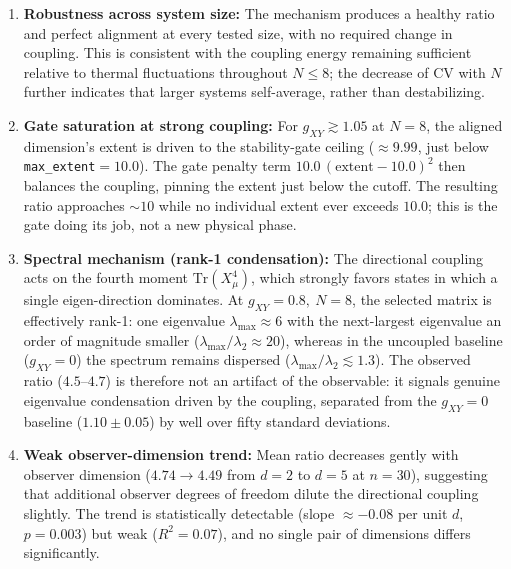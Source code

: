 \documentclass[12pt,a4paper]{article}
\begin{document}
\begin{enumerate}[leftmargin=*]
\item \textbf{Robustness across system size:}
The mechanism produces a healthy ratio and perfect alignment at every tested
size, with no required change in coupling. This is consistent with the
coupling energy remaining sufficient relative to thermal fluctuations
throughout $N \leq 8$; the decrease of CV with $N$ further indicates that
larger systems self-average, rather than destabilizing.

\item \textbf{Gate saturation at strong coupling:}
For $g_{XY} \gtrsim 1.05$ at $N=8$, the aligned dimension's extent is driven
to the stability-gate ceiling ($\approx 9.99$, just below
\texttt{max\_extent}$=10.0$). The gate penalty term
$10.0\,(\text{extent} - 10.0)^2$ then balances the coupling, pinning the
extent just below the cutoff. The resulting ratio approaches $\sim 10$ while
no individual extent ever exceeds $10.0$; this is the gate doing its job,
not a new physical phase.

\item \textbf{Spectral mechanism (rank-1 condensation):}
The directional coupling acts on the fourth moment
$\mathrm{Tr}(X_\mu^4)$, which strongly favors states in which a single
eigen-direction dominates. At $g_{XY}=0.8,\ N=8$, the selected matrix is
effectively rank-1: one eigenvalue $\lambda_{\max}\approx 6$ with the
next-largest eigenvalue an order of magnitude smaller
($\lambda_{\max}/\lambda_2 \approx 20$), whereas in the uncoupled baseline
($g_{XY}=0$) the spectrum remains dispersed
($\lambda_{\max}/\lambda_2 \lesssim 1.3$). The observed ratio
($4.5$--$4.7$) is therefore not an artifact of the observable: it signals
genuine eigenvalue condensation driven by the coupling, separated from the
$g_{XY}=0$ baseline ($1.10\pm0.05$) by well over fifty standard deviations.

\item \textbf{Weak observer-dimension trend:}
Mean ratio decreases gently with observer dimension ($4.74 \to 4.49$ from
$d=2$ to $d=5$ at $n=30$), suggesting that additional observer degrees of
freedom dilute the directional coupling slightly. The trend is statistically
detectable (slope $\approx -0.08$ per unit $d$, $p=0.003$) but weak
($R^2=0.07$), and no single pair of dimensions differs significantly.
\end{enumerate}

\end{document}
